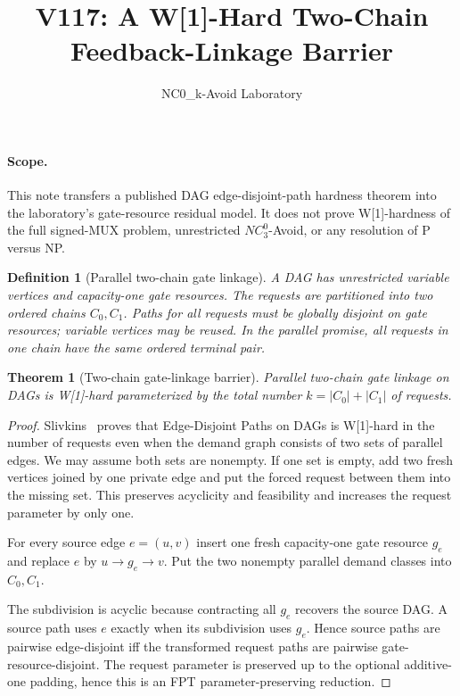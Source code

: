 \documentclass[11pt]{article}
\title{V117: A W[1]-Hard Two-Chain Feedback-Linkage Barrier}
\author{NC0\_k-Avoid Laboratory}
\date{}
\newtheorem{theorem}{Theorem}
\newtheorem{definition}{Definition}
\begin{document}
\maketitle

\paragraph{Scope.}
This note transfers a published DAG edge-disjoint-path hardness theorem into the laboratory's gate-resource residual model. It does not prove W[1]-hardness of the full signed-MUX problem, unrestricted $NC^0_3$-Avoid, or any resolution of P versus NP.

\begin{definition}[Parallel two-chain gate linkage]
A DAG has unrestricted variable vertices and capacity-one gate resources. The requests are partitioned into two ordered chains $C_0,C_1$. Paths for all requests must be globally disjoint on gate resources; variable vertices may be reused. In the parallel promise, all requests in one chain have the same ordered terminal pair.
\end{definition}

\begin{theorem}[Two-chain gate-linkage barrier]
Parallel two-chain gate linkage on DAGs is W[1]-hard parameterized by the total number $k=|C_0|+|C_1|$ of requests.
\end{theorem}
\begin{proof}
Slivkins~\cite{Slivkins2010} proves that Edge-Disjoint Paths on DAGs is W[1]-hard in the number of requests even when the demand graph consists of two sets of parallel edges. We may assume both sets are nonempty. If one set is empty, add two fresh vertices joined by one private edge and put the forced request between them into the missing set. This preserves acyclicity and feasibility and increases the request parameter by only one.

For every source edge $e=(u,v)$ insert one fresh capacity-one gate resource $g_e$ and replace $e$ by $u\to g_e\to v$. Put the two nonempty parallel demand classes into $C_0,C_1$.

The subdivision is acyclic because contracting all $g_e$ recovers the source DAG. A source path uses $e$ exactly when its subdivision uses $g_e$. Hence source paths are pairwise edge-disjoint iff the transformed request paths are pairwise gate-resource-disjoint. The request parameter is preserved up to the optional additive-one padding, hence this is an FPT parameter-preserving reduction.
\end{proof}
\end{document}
